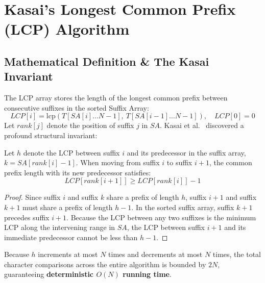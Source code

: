 \section{Kasai's Longest Common Prefix (LCP) Algorithm}
\subsection{Mathematical Definition \& The Kasai Invariant}
The LCP array stores the length of the longest common prefix between consecutive suffixes in the sorted Suffix Array:
\begin{equation}
LCP[i] = \text{lcp}(T[SA[i] \dots N-1], \ T[SA[i-1] \dots N-1]), \quad LCP[0] = 0
\end{equation}
Let $rank[j]$ denote the position of suffix $j$ in $SA$. Kasai et al.~\cite{kasai2001} discovered a profound structural invariant:
\begin{theorem}
Let $h$ denote the LCP between suffix $i$ and its predecessor in the suffix array, $k = SA[rank[i] - 1]$. When moving from suffix $i$ to suffix $i + 1$, the common prefix length with its new predecessor satisfies:
\begin{equation}
LCP[rank[i + 1]] \ge LCP[rank[i]] - 1
\end{equation}
\end{theorem}
\begin{proof}
Since suffix $i$ and suffix $k$ share a prefix of length $h$, suffix $i + 1$ and suffix $k + 1$ must share a prefix of length $h - 1$. In the sorted suffix array, suffix $k + 1$ precedes suffix $i + 1$. Because the LCP between any two suffixes is the minimum LCP along the intervening range in $SA$, the LCP between suffix $i + 1$ and its immediate predecessor cannot be less than $h - 1$.
\end{proof}
Because $h$ increments at most $N$ times and decrements at most $N$ times, the total character comparisons across the entire algorithm is bounded by $2N$, guaranteeing \textbf{deterministic $O(N)$ running time}.

